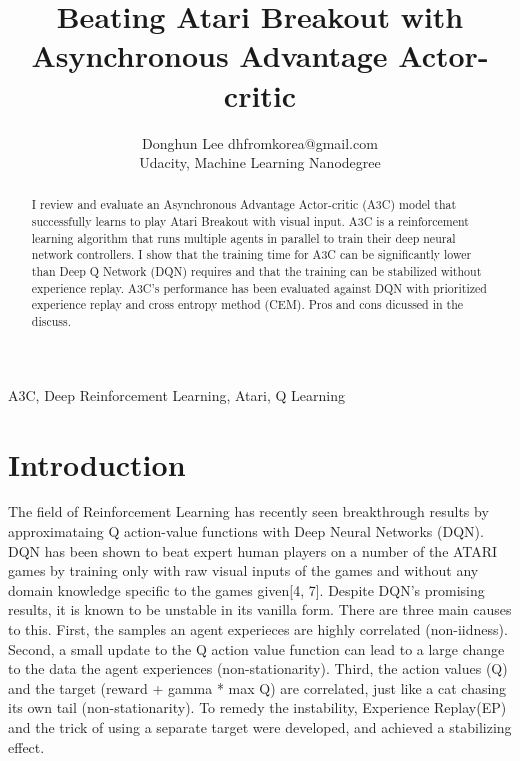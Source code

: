 \documentclass[twoside,11pt]{article}
\begin{document}
\title{Beating Atari Breakout with \\ 
Asynchronous Advantage Actor-critic}

\author{\name Donghun Lee \email dhfromkorea@gmail.com \\
       \addr Udacity, Machine Learning Nanodegree\\
       }

\maketitle

\begin{abstract}%
I review and evaluate an Asynchronous Advantage Actor-critic (A3C) model \citet{chow:68} that successfully learns to play Atari Breakout with visual input. A3C is a reinforcement learning algorithm that runs multiple agents in parallel to train their deep neural network controllers. I show that the training time for A3C can be significantly lower than Deep Q Network (DQN) requires and that the training can be stabilized without experience replay. A3C's performance has been evaluated against DQN with prioritized experience replay and cross entropy method (CEM). Pros and cons dicussed in the discuss. 
\end{abstract}

\begin{keywords}
  A3C, Deep Reinforcement Learning, Atari, Q Learning
\end{keywords}

\section{Introduction}

The field of Reinforcement Learning has recently seen breakthrough results by approximataing Q action-value functions with Deep Neural Networks (DQN). DQN has been shown to beat expert human players on a number of the ATARI games by training only with raw visual inputs of the games and without any domain knowledge specific to the games given[4, 7]. Despite DQN's promising results, it is known to be unstable in its vanilla form. There are three main causes to this. First, the samples an agent experieces are highly correlated (non-iidness). Second, a small update to the Q action value function can lead to a large change to the data the agent experiences (non-stationarity). Third, the action values (Q) and the target (reward + gamma * max Q) are correlated, just like a cat chasing its own tail (non-stationarity). To remedy the instability, Experience Replay(EP) and the trick of using a separate target were developed, and achieved a stabilizing effect.
\end{document}
